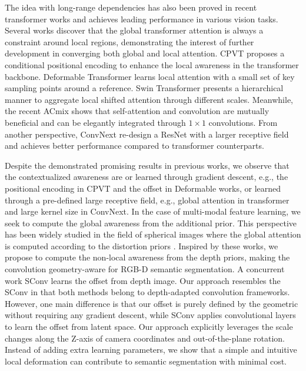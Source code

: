 \documentclass[lettersize,journal]{IEEEtran}
\begin{document}
The idea with long-range dependencies has also been proved in recent transformer works \cite{vaswani2017attention,vit,liu2021Swin} and achieves leading performance in various vision tasks. Several works \cite{chu2021conditional,liu2021Swin} discover that the global transformer attention is always a constraint around local regions, demonstrating the interest of further development in converging both global and local attention. CPVT \cite{chu2021conditional} proposes a conditional positional encoding to enhance the local awareness in the transformer backbone. Deformable Transformer \cite{deformabledetr} learns local attention with a small set of key sampling points around a reference. Swin Transformer \cite{liu2021Swin} presents a hierarchical manner to aggregate local shifted attention through different scales. Meanwhile, the recent ACmix \cite{pan2021integration} shows that self-attention and convolution are mutually beneficial and can be elegantly integrated through $1 \times 1$ convolutions. From another perspective, ConvNext \cite{liu2022convnet} re-design a ResNet with a larger receptive field and achieves better performance compared to transformer counterparts.

Despite the demonstrated promising results in previous works, we observe that the contextualized awareness are or learned through gradient descent, e.g., the positional encoding in CPVT and the offset in Deformable works, or learned through a pre-defined large receptive field, e.g., global attention in transformer and large kernel size in ConvNext. In the case of multi-modal feature learning, we seek to compute the global awareness from the additional prior. This perspective has been widely studied in the field of spherical images where the global attention is computed according to the distortion priors  \cite{cohen2018Spherical,coors2018spherenet,tateno2018distortion,CFL}. Inspired by these works, we propose to compute the non-local awareness from the depth priors, making the convolution geometry-aware for RGB-D semantic segmentation. A concurrent work SConv \cite{chen2021spatial} learns the offset from depth image. Our approach resembles the SConv in that both methods belong to depth-adapted convolution frameworks. However, one main difference is that our offset is purely defined by the geometric without requiring any gradient descent, while SConv applies convolutional layers to learn the offset from latent space. Our approach explicitly leverages the scale changes along the Z-axis of camera coordinates and out-of-the-plane rotation. Instead of adding extra learning parameters, we show that a simple and intuitive local deformation can contribute to semantic segmentation with minimal cost. 
\end{document}
